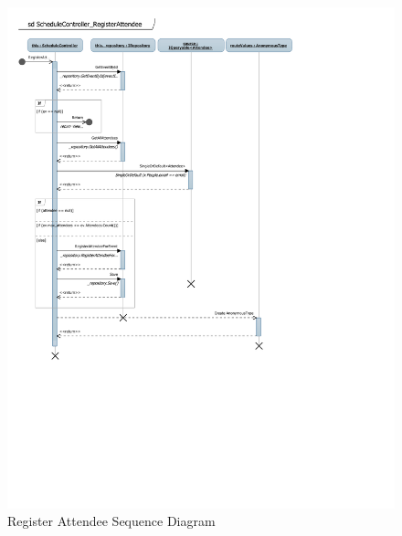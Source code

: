 \documentclass[12pt]{article}
\begin{document}
\begin{figure}[H]
\centering
\caption{Register Attendee Sequence Diagram}
\includegraphics[scale=0.8]{RegisterAttendee_sequence}
\end{figure}
\newpage
\end{document}
